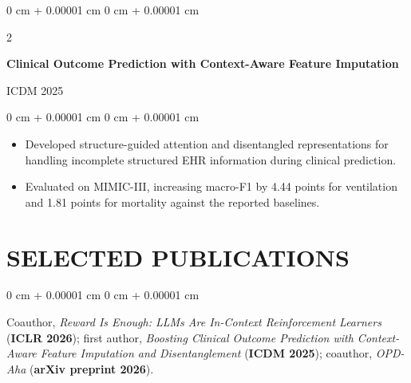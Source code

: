 \documentclass[10pt, letterpaper]{article}
\newenvironment{highlights}{
    \begin{itemize}[
        topsep=0.03 cm,
        parsep=0.03 cm,
        partopsep=0pt,
        itemsep=0pt,
        leftmargin=0 cm + 10pt
    ]
}{
    \end{itemize}
} %
\newenvironment{onecolentry}{
    \begin{adjustwidth}{
        0 cm + 0.00001 cm
    }{
        0 cm + 0.00001 cm
    }
}{
    \end{adjustwidth}
} %
\newenvironment{twocolentry}[2][]{
    \onecolentry
    \def\secondColumn{#2}
    \setcolumnwidth{\fill, 4.5 cm}
    \begin{paracol}{2}
}{
    \switchcolumn \raggedleft \secondColumn
    \end{paracol}
    \endonecolentry
} %
\begin{document}
\begin{twocolentry}{ICDM 2025}
\textbf{Clinical Outcome Prediction with Context-Aware Feature Imputation}
\end{twocolentry}
\begin{onecolentry}
\begin{highlights}
\item Developed structure-guided attention and disentangled representations for handling incomplete structured EHR information during clinical prediction.
\item Evaluated on MIMIC-III, increasing macro-F1 by 4.44 points for ventilation and 1.81 points for mortality against the reported baselines.
\end{highlights}
\end{onecolentry}
\vspace{0.035 cm}
\section{SELECTED PUBLICATIONS}
\begin{onecolentry}
Coauthor, \textit{Reward Is Enough: LLMs Are In-Context Reinforcement Learners} (\textbf{ICLR 2026}); first author, \textit{Boosting Clinical Outcome Prediction with Context-Aware Feature Imputation and Disentanglement} (\textbf{ICDM 2025}); coauthor, \textit{OPD-Aha} (\textbf{arXiv preprint 2026}).
\end{onecolentry}
\end{document}

